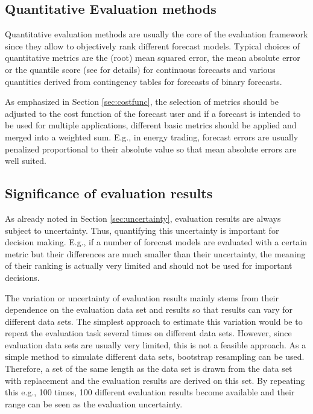 
\subsection{Quantitative Evaluation methods }
Quantitative evaluation methods are usually the core of the evaluation framework since they allow to objectively rank different forecast models.
Typical choices of quantitative metrics are the (root) mean squared error, the mean absolute error or the quantile score (see \cite{Messner2018} for details) for continuous forecasts and various quantities derived from contingency tables for forecasts of binary forecasts.

As emphasized in Section \ref{sec:costfunc}, the selection of metrics should be adjusted to the cost function of the forecast user and if a forecast is intended to be used for multiple applications, different basic metrics should be applied and merged into a weighted sum. 
E.g., in energy trading, forecast errors are usually penalized proportional to their absolute value so that mean absolute errors are well suited. 


\subsection{Significance of evaluation results} 
As already noted in Section \ref{sec:uncertainty}, evaluation results are always subject to uncertainty. Thus, quantifying this uncertainty is important for decision making. E.g., if a number of forecast models are evaluated with a certain metric but their differences are much smaller than their uncertainty, the meaning of their ranking is actually very limited and should not be used for important decisions.

The variation or uncertainty of evaluation results mainly stems from their dependence on the evaluation data set and results so that results can vary for different data sets.
The simplest approach to estimate this variation would be to repeat the evaluation task several times on different data sets. However, since evaluation data sets are usually very limited, this is not a feasible approach. 
As a simple method to simulate different data sets, bootstrap resampling can be used. Therefore, a set of the same length as the data set is drawn from the data set with replacement and the evaluation results are derived on this set. By repeating this e.g., 100 times, 100 different evaluation results become available and their range can be seen as the evaluation uncertainty.

